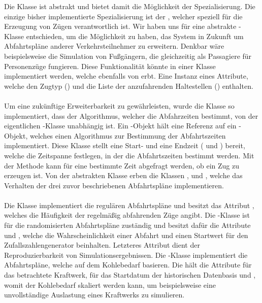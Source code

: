 Die Klasse  ist abstrakt und bietet damit die Möglichkeit der Spezialisierung. Die einzige bisher implementierte Spezialisierung ist der , welcher speziell für die Erzeugung von Zügen verantwortlich ist. Wir haben uns für eine abstrakte -Klasse entschieden, um die Möglichkeit zu haben, das System in Zukunft um Abfahrtspläne anderer Verkehrsteilnehmer zu erweitern. Denkbar wäre beispielsweise die Simulation von Fußgängern, die gleichzeitig als Passagiere für Personenzüge fungieren. Diese Funktionalität könnte in einer Klasse  implementiert werden, welche ebenfalls von  erbt. Eine Instanz eines  Attribute, welche den Zugtyp () und die Liste der anzufahrenden Haltestellen () enthalten.\\
\\
Um eine zukünftige Erweiterbarkeit zu gewährleisten, wurde die Klasse  so implementiert, dass der Algorithmus, welcher die Abfahrzeiten bestimmt, von der eigentlichen -Klasse unabhängig ist. Ein -Objekt hält eine Referenz auf ein -Objekt, welches einen Algorithmus zur Bestimmung der Abfahrtszeiten implementiert. Diese Klasse stellt eine Start- und eine Endzeit ( und ) bereit, welche die Zeitspanne festlegen, in der die Abfahrtszeiten bestimmt werden. Mit der Methode  kann für eine bestimmte Zeit abgefragt werden, ob ein Zug zu erzeugen ist. Von der abstrakten Klasse  erben die Klassen ,  und , welche das Verhalten der drei zuvor beschriebenen Abfahrtspläne implementieren.\\
\\
Die Klasse  implementiert die regulären Abfahrtspläne und besitzt das Attribut , welches die Häufigkeit der regelmäßig abfahrenden Züge angibt. Die -Klasse ist für die randomisierten Abfahrtspläne zuständig und besitzt dafür die Attribute  und , welche die Wahrscheinlichkeit einer Abfahrt und einen Startwert für den Zufallszahlengenerator beinhalten. Letzteres Attribut dient der Reproduzierbarkeit von Simulationsergebnissen. Die -Klasse implementiert die Abfahrtspläne, welche auf dem Kohlebedarf basieren. Die hält die Attribute  für das betrachtete Kraftwerk,  für das Startdatum der historischen Datenbasis und , womit der Kohlebedarf skaliert werden kann, um beispielsweise eine unvollständige Auslastung eines Kraftwerks zu simulieren.

